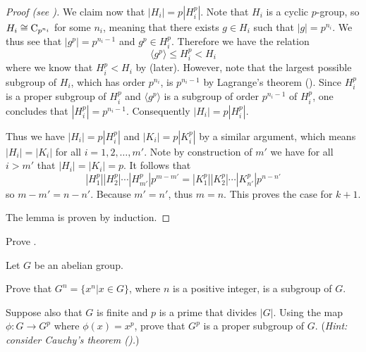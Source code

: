 \begin{proof}[Proof (see {\cite[p.~219, Lemma 4]{gallian_2016}})]
    We claim now that $|H_i| = p|H_i^p|$. Note that $H_i$ is a cyclic $p$-group, so $H_i \cong \mathrm{C}_{p^{n_i}}$ for some $n_i$, meaning that there exists $g \in H_i$ such that $|g| = p^{n_i}$. We thus see that $|g^p| = p^{n_i-1}$ and $g^p \in H_i^p$. Therefore we have the relation
    \[
        \langle g^p \rangle \leq H_i^p < H_i
    \]
    where we know that $H_i^p < H_i$ by  (later). However, note that the largest possible subgroup of $H_i$, which has order $p^{n_i}$, is $p^{n_i-1}$ by Lagrange's theorem (). Since $H_i^p$ is a proper subgroup of $H_i^p$ and $\langle g^p \rangle$ is a subgroup of order $p^{n_i-1}$ of $H_i^p$, one concludes that $|H_i^p| = p^{n_i-1}$. Consequently $|H_i| = p|H_i^p|$.

    Thus we have $|H_i| = p|H_i^p|$ and $|K_i| = p|K_i^p|$ by a similar argument, which means $|H_i| = |K_i|$ for all $i = 1, 2, \dots, m'$. Note by construction of $m'$ we have for all $i > m'$ that $|H_i| = |K_i| = p$. It follows that
    \[
        |H_1^p||H_2^p|\cdots|H_{m'}^p|p^{m-m'} = |K_1^p||K_2^p|\cdots|K_{n'}^p|p^{n-n'}
    \]
    so $m - m' = n - n'$. Because $m' = n'$, thus $m = n$. This proves the case for $k + 1$.

    The lemma is proven by induction.
\end{proof}

\begin{exercise}\label{exercise-prove-lemma-fundamental-theorem-of-finite-abelian-groups-3}
    Prove .
\end{exercise}

\begin{exercise}\label{exercise-group-power-is-subgroup}
    Let $G$ be an abelian group.
    \begin{partquestions}{\roman*}
        \item Prove that $G^n = \{x^n \vert x \in G\}$, where $n$ is a positive integer, is a subgroup of $G$.
        \item Suppose also that $G$ is finite and $p$ is a prime that divides $|G|$. Using the map $\phi: G \to G^p$ where $\phi(x) = x^p$, prove that $G^p$ is a proper subgroup of $G$.\newline
        (\textit{Hint: consider Cauchy's theorem ().})
    \end{partquestions}
\end{exercise}

